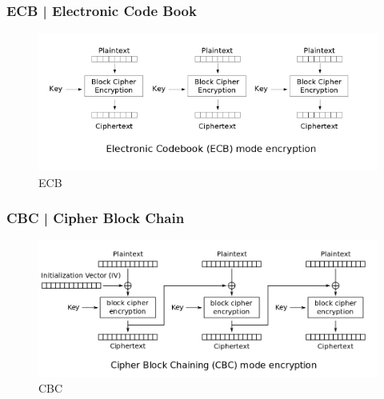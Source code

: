 \textsf{\small }

\subsubsection{ECB | Electronic Code Book}




\textsf{\small }

\begin{figure}[H]
	\centering
	\includegraphics[width=.9\textwidth, height=.9\textheight, keepaspectratio]{./images/aes_modes/ecb_encryption.png} %
	\caption{ECB}
	\label{fig:ecb}
\end{figure}

\subsubsection{CBC | Cipher Block Chain}


\textsf{\small }

\begin{figure}[H]
	\centering
	\includegraphics[width=1\textwidth, height=1\textheight, keepaspectratio]{./images/aes_modes/cbc.png} %
	\caption{CBC}
	\label{fig:cbc}
\end{figure}


